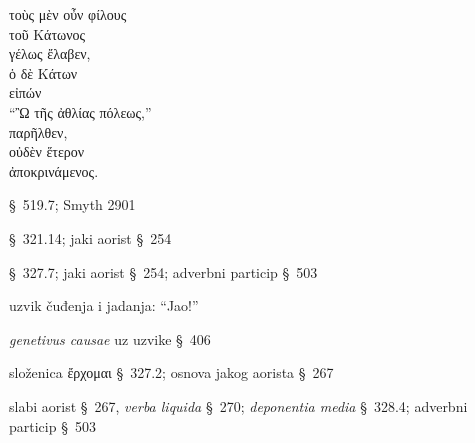 
{\large
\begin{greek}
\noindent τοὺς μὲν οὖν φίλους \\
\tabto{2em} τοῦ Κάτωνος \\
γέλως ἔλαβεν, \\
ὁ δὲ Κάτων \\
\tabto{2em} εἰπών \\
\tabto{4em} ``Ὢ τῆς ἀθλίας πόλεως,''\\
παρῆλθεν, \\
οὐδὲν ἕτερον \\
\tabto{2em} ἀποκρινάμενος. \\

\end{greek}
}

\begin{description}[noitemsep]
\item[μὲν οὖν] §~519.7; Smyth 2901
\item[ἔλαβεν] §~321.14; jaki aorist §~254
\item[εἰπών] §~327.7; jaki aorist §~254; adverbni particip §~503
\item[Ὢ] uzvik čuđenja i jadanja: ``Jao!''
\item[τῆς ἀθλίας πόλεως] \textit{genetivus causae} uz uzvike §~406
\item[παρῆλθεν] složenica ἔρχομαι §~327.2; osnova jakog aorista §~267
\item[ἀποκρινάμενος] slabi aorist §~267, \textit{verba liquida} §~270; \textit{deponentia media} §~328.4; adverbni particip §~503

\end{description}



